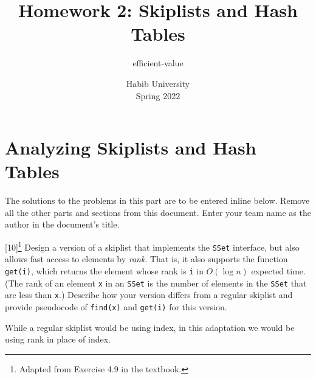 \documentclass[addpoints]{exam}
\title{Homework 2: Skiplists and Hash Tables}
\author{efficient-value}  %
\date{Habib University\\Spring 2022}
\begin{document}
\maketitle
\part{Analyzing Skiplists and Hash Tables}

The solutions to the problems in this part are to be entered inline below. Remove all the other parts and sections from this document. Enter your team name as the author in the document's title.

\begin{questions}

[10]\footnote{Adapted from Exercise 4.9 in the textbook.}
  Design a version of a skiplist that implements the \texttt{SSet} interface, but also allows fast access to elements by \textit{rank}. That is, it also supports the function \texttt{get(i)}, which returns the element whose rank is \texttt{i} in $O(\log n)$ expected time. (The rank of an element \texttt{x} in an \texttt{SSet} is the number of elements in the \texttt{SSet} that are less than \texttt{x}.)
  Describe how your version differs from a regular skiplist and provide pseudocode of \texttt{find(x)} and \texttt{get(i)} for this version.
  \begin{solution}
  While a regular skiplist would be using index, in this adaptation we would be using rank in place of index.\\
 

\end{solution}
\end{questions}
\end{document}
